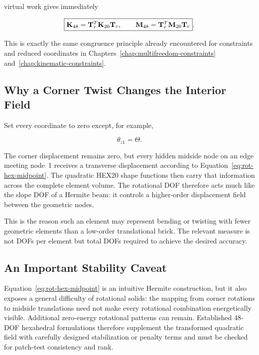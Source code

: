 virtual work gives immediately

\begin{equation}\label{eq:rot-hex-km}
    \boxed{
    \mathbf{K}_{48}=\mathbf{T}_{r}^{T}\mathbf{K}_{20}\mathbf{T}_{r},
    \qquad
    \mathbf{M}_{48}=\mathbf{T}_{r}^{T}\mathbf{M}_{20}\mathbf{T}_{r}
    }.
\end{equation}

This is exactly the same congruence principle already encountered for
constraints and reduced coordinates in Chapters~\ref{chap:multifreedom-constraints}
and~\ref{chap:kinematic-constraints}.

\subsection{Why a Corner Twist Changes the Interior Field}

Set every coordinate to zero except, for example,

\begin{equation}
    \theta_{z1}=\Theta.
\end{equation}

The corner displacement remains zero, but every hidden midside node on an edge
meeting node~1 receives a transverse displacement according to
Equation~\eqref{eq:rot-hex-midpoint}.  The quadratic HEX20 shape functions then
carry that information across the complete element volume.  The rotational DOF
therefore acts much like the slope DOF of a Hermite beam: it controls a
higher-order displacement field between the geometric nodes.

This is the reason such an element may represent bending or twisting with fewer
geometric elements than a low-order translational brick.  The relevant measure
is not DOFs per element but total DOFs required to achieve the desired accuracy.

\subsection{An Important Stability Caveat}

Equation~\eqref{eq:rot-hex-midpoint} is an intuitive Hermite construction, but
it also exposes a general difficulty of rotational solids: the mapping from
corner rotations to midside translations need not make every rotational
combination energetically visible.  Additional zero-energy rotational patterns
can remain.  Established 48-DOF hexahedral formulations therefore supplement
the transformed quadratic field with carefully designed stabilization or
penalty terms and must be checked for patch-test consistency and rank.

